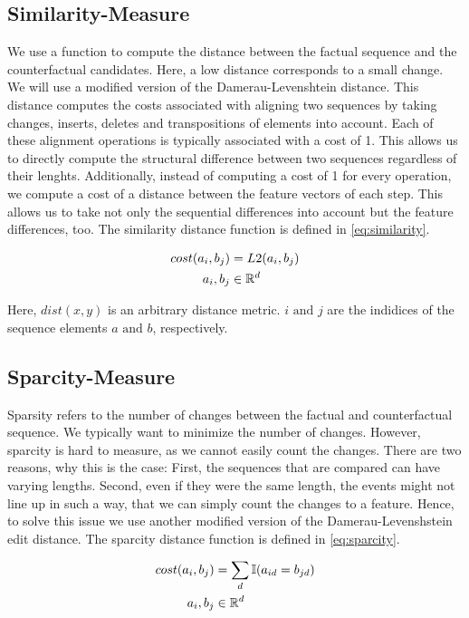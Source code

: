 \documentclass[./../../paper.tex]{subfiles}
\begin{document}
\subsection{Similarity-Measure}
We use a function to compute the distance between the factual sequence and the counterfactual candidates. Here, a low distance corresponds to a small change. We will use a modified version of the Damerau-Levenshtein distance. This distance computes the costs associated with aligning two sequences by taking changes, inserts, deletes and transpositions of elements into account. Each of these alignment operations is typically associated with a cost of 1. This allows us to directly compute the structural difference between two sequences regardless of their lenghts. Additionally, instead of computing a cost of 1 for every operation, we compute a cost of a distance between the feature vectors of each step. This allows us to take not only the sequential differences into account but the feature differences, too. The similarity distance function is defined in \autoref{eq:similarity}.

\begin{align}
    \label{eq:similarity}
    cost(a_i, b_j)      & = L2(a_i, b_j) \\
    a_i,b_j        & \in \mathbb{R}^d
\end{align}

\noindent Here, $dist(x,y)$ is an arbitrary distance metric. $i \text{ and } j$ are the indidices of the sequence elements $a \text{ and } b$, respectively.

\subsection{Sparcity-Measure}
Sparsity refers to the number of changes between the factual and counterfactual sequence. We typically want to minimize the number of changes. However, sparcity is hard to measure, as we cannot easily count the changes. There are two reasons, why this is the case: First, the sequences that are compared can have varying lengths. Second, even if they were the same length, the events might not line up in such a way, that we can simply count the changes to a feature. Hence, to solve this issue we use another modified version of the Damerau-Levenshstein edit distance. The sparcity distance function is defined in \autoref{eq:sparcity}.

\begin{align}
    \label{eq:sparcity}                          
    cost(a_i, b_j)      & = \sum_d \mathbb{I}(a_{id} = b_{jd}) \\
    a_i,b_j        & \in \mathbb{R}^d
\end{align}
\end{document}
